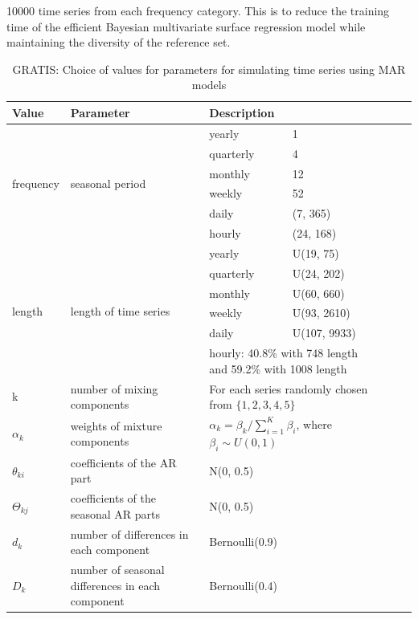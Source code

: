\documentclass[11pt,a4paper,]{article}
\begin{document}
10000 time series from each frequency category. This is to reduce the training time of the efficient Bayesian multivariate surface regression model while maintaining the diversity of the reference set.

\begin{table}[!h]
\centering\footnotesize\tabcolsep=0.12cm
\caption{GRATIS: Choice of values for parameters for simulating time series using MAR models}
\label{marparameters}
\begin{tabular}{llp{1.5cm}lp{1cm}lp{1cm}}
          Value        &      Parameter             & \multicolumn{2}{p{1cm}}{Description} \\ \hline
\multirow{6}{*}{frequency} & \multirow{6}{*}{seasonal period} &     yearly      &  1         \\  
                  &                   &     quarterly      &     4      \\ 
                  &                   &    monthly       &       12    \\  
                  &                   &      weekly     &       52    \\  
                  &                   &  daily         &      (7, 365)     \\  
                  &                   &    hourly       &     (24, 168)     \\ \hline
\multirow{6}{*}{length} & \multirow{6}{*}{length of time series} &   yearly        &         U(19, 75)  \\ 
                  &                   &     quarterly      &     U(24, 202)      \\  
                  &                   &     monthly      &   U(60, 660)        \\  
                  &                   &    weekly       &      U(93, 2610)     \\  
                  &                   &    daily       &    U(107, 9933)       \\  
                  &                   & \multicolumn{2}{p{5cm}}{hourly: 40.8\% with 748 length and 59.2\% with 1008 length} \\ \hline
 k                 &    number of mixing components               & \multicolumn{2}{p{5cm}}{For each series randomly chosen from $\{1, 2, 3, 4,5\}$} \\
$\alpha_k$                   &   weights of mixture components                & \multicolumn{2}{l}{$\alpha_k=\beta_k/\sum_{i=1}^{K}\beta_i$, where $\beta_i \sim U(0, 1)$} \\ 
$\theta_{ki}$  &  coefficients of the AR part & \multicolumn{2}{l}{N(0, 0.5)} \\ 
$\Theta_{kj}$ &  coefficients of the seasonal AR parts & \multicolumn{2}{l}{N(0, 0.5)} \\
$d_k$ &  number of differences in each component & \multicolumn{2}{l}{Bernoulli(0.9)} \\
$D_k$ & number of seasonal differences in each component & \multicolumn{2}{l}{Bernoulli(0.4)} \\
\hline
\end{tabular}
\end{table}
\end{document}
